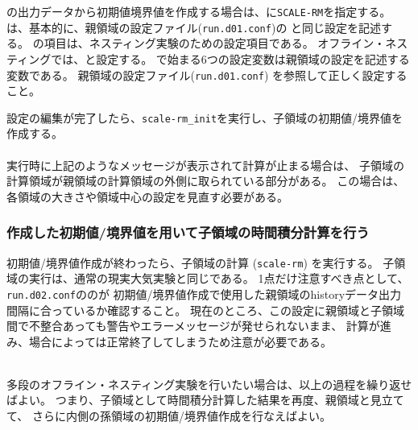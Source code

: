 \scalerm の出力データから初期値境界値を作成する場合は、に\verb|SCALE-RM|を指定する。
は、基本的に、親領域の設定ファイル(\verb|run.d01.conf|)の
と同じ設定を記述する。
%
の項目は、ネスティング実験のための設定項目である。
オフライン・ネスティングでは、と設定する。
 で始まる6つの設定変数は親領域の設定を記述する変数である。
親領域の設定ファイル(\verb|run.d01.conf|) を参照して正しく設定すること。


設定の編集が完了したら、\verb|scale-rm_init|を実行し、子領域の初期値/境界値を作成する。\\

\\

\noindent 実行時に上記のようなメッセージが表示されて計算が止まる場合は、
子領域の計算領域が親領域の計算領域の外側に取られている部分がある。
この場合は、各領域の大きさや領域中心の設定を見直す必要がある。


\subsubsection{作成した初期値/境界値を用いて子領域の時間積分計算を行う}
初期値/境界値作成が終わったら、子領域の計算 (\verb|scale-rm|) を実行する。
子領域の実行は、通常の現実大気実験と同じである。
1点だけ注意すべき点として、
\verb|run.d02.conf|ののが
初期値/境界値作成で使用した親領域のhistoryデータ出力間隔に合っているか確認すること。
現在のところ、この設定に親領域と子領域間で不整合あっても警告やエラーメッセージが発せられないまま、
計算が進み、場合によっては正常終了してしまうため注意が必要である。


\\

\noindent 
多段のオフライン・ネスティング実験を行いたい場合は、以上の過程を繰り返せばよい。
つまり、子領域として時間積分計算した結果を再度、親領域と見立てて、
さらに内側の孫領域の初期値/境界値作成を行なえばよい。


